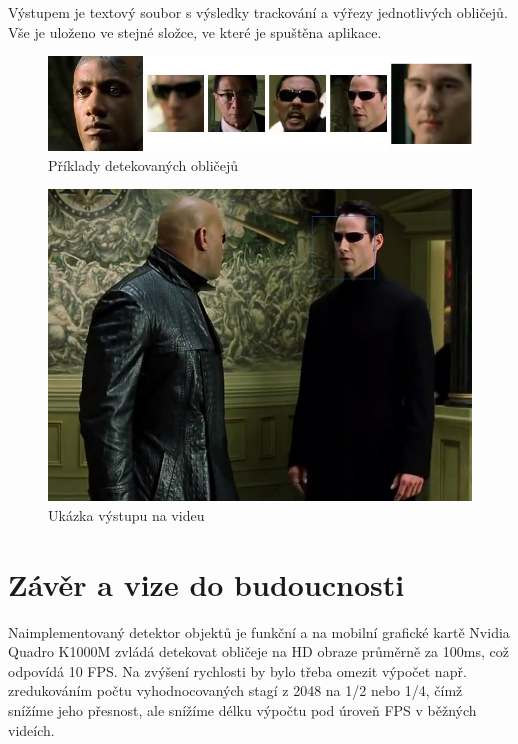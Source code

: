 \documentclass[12pt,a4paper,titlepage,final]{report}
\begin{document}
Výstupem je textový soubor s výsledky trackování a výřezy jednotlivých obličejů. Vše je uloženo ve stejné složce, ve které je spuštěna aplikace.

\begin{figure}[ht]
\begin{center}
\includegraphics[width=14cm]{images/faces.jpg}
\caption{Příklady detekovaných obličejů}
\label{fig:theory}
\end{center}
\end{figure}

\begin{figure}[ht]
\begin{center}
\includegraphics[width=14cm]{images/matrix.jpg}
\caption{Ukázka výstupu na videu}
\label{fig:theory}
\end{center}
\end{figure}

\section{Závěr a vize do budoucnosti}

Naimplementovaný detektor objektů je funkční a na mobilní grafické kartě Nvidia Quadro K1000M zvládá detekovat obličeje na HD obraze průměrně za 100ms, což odpovídá 10 FPS. Na zvýšení rychlosti by bylo třeba omezit výpočet např. zredukováním počtu vyhodnocovaných stagí z 2048 na 1/2 nebo 1/4, čímž snížíme jeho přesnost, ale snížíme délku výpočtu pod úroveň FPS v běžných videích.
\end{document}
